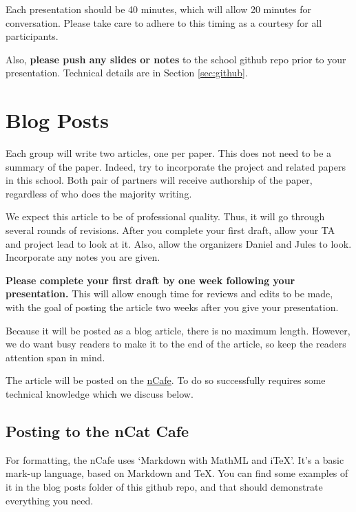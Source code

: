 \documentclass[11pt, oneside]{article}
\begin{document}
Each presentation should be 40 minutes, which will allow 20
minutes for conversation.  Please take care to adhere to
this timing as a courtesy for all participants.

Also, \textbf{please push any slides or notes} to the school
github repo prior to your presentation. Technical details
are in Section \ref{sec:github}.

\pagebreak

\section{Blog Posts}
\label{sec:blog}

Each group will write two articles, one per paper. This does
not need to be a summary of the paper. Indeed, try to
incorporate the project and related papers in this
school. Both pair of partners will receive authorship of the
paper, regardless of who does the majority writing.

We expect this article to be of professional quality. Thus,
it will go through several rounds of revisions.  After you
complete your first draft, allow your TA and project lead to
look at it.  Also, allow the organizers Daniel and Jules to
look.  Incorporate any notes you are given.

\textbf{Please complete your first draft by one week
  following your presentation.} This will allow enough time
for reviews and edits to be made, with the goal of posting
the article two weeks after you give your presentation.

Because it will be posted as a blog article, there is no
maximum length. However, we do want busy readers to make it
to the end of the article, so keep the readers attention
span in mind.

The article will be posted on the
\href{https://golem.ph.utexas.edu/category/}{nCafe}. To do so successfully requires some technical
knowledge which we discuss below.

\subsection{Posting to the nCat Cafe}
\label{sec:ncat}

For formatting, the nCafe uses `Markdown with MathML and
iTeX'. It's a basic mark-up language, based on Markdown and
TeX.  You can find some examples of it in the blog posts
folder of this github repo, and that should demonstrate
everything you need.
\end{document}
